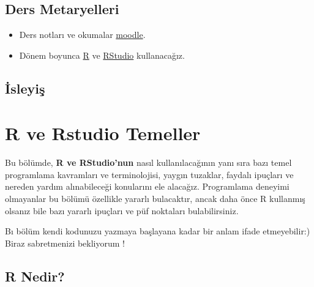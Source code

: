 \documentclass[
  oneside]{book}
\begin{document}
\hypertarget{ders-metaryelleri}{%
\section*{Ders Metaryelleri}\label{ders-metaryelleri}}

\begin{itemize}
\item
  Ders notları ve okumalar \href{https://lisansustu.hacettepe.edu.tr/login/index.php}{moodle}.
\item
  Dönem boyunca \href{https://cran.r-project.org/}{R} ve \href{https://www.rstudio.com/}{RStudio} kullanacağız.
\end{itemize}

\hypertarget{isleyiux15f}{%
\section*{İsleyiş}\label{isleyiux15f}}

\hypertarget{r-ve-rstudio-temeller}{%
\chapter{R ve Rstudio Temeller}\label{r-ve-rstudio-temeller}}

Bu bölümde, \textbf{R ve RStudio'nun} nasıl kullanılacağının yanı sıra bazı temel programlama kavramları ve terminolojisi, yaygın tuzaklar, faydalı ipuçları ve nereden yardım alınabileceği konularını ele alacağız. Programlama deneyimi olmayanlar bu bölümü özellikle yararlı bulacaktır, ancak daha önce R kullanmış olsanız bile bazı yararlı ipuçları ve püf noktaları bulabilirsiniz.

Bı bölüm kendi kodunuzu yazmaya başlayana kadar bir anlam ifade etmeyebilir:) Biraz sabretmenizi bekliyorum !

\hypertarget{r-nedir}{%
\section{R Nedir?}\label{r-nedir}}
\end{document}
